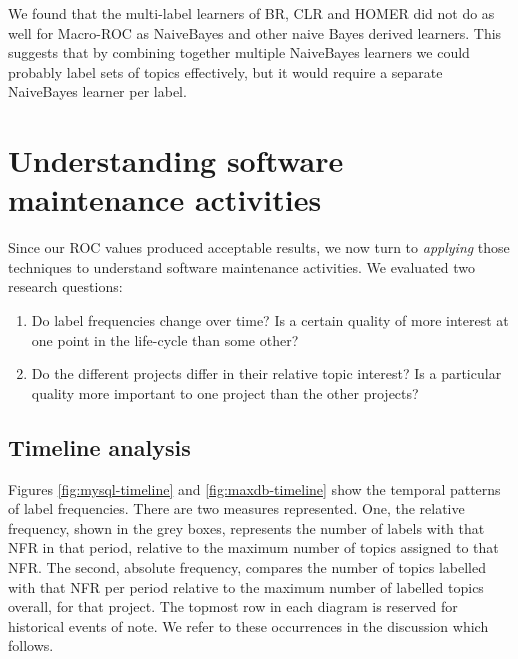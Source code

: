 \documentclass[]{sig-alternate}
\begin{document}
We found that the multi-label learners of BR, CLR and HOMER did not do as well for Macro-ROC as NaiveBayes and other naive Bayes derived learners. 
This suggests that by combining together multiple NaiveBayes learners we could probably label sets of topics effectively, but it would require a separate NaiveBayes learner per label.


\section{Understanding software maintenance activities} 
\label{sec:analysis}
Since our ROC values produced acceptable results, we now turn to \emph{applying} those techniques to understand software maintenance activities. We evaluated two research questions:
\begin{enumerate}
\item Do label frequencies change over time? Is a certain quality of more interest at one point in the life-cycle than some other? 
\item  Do the different projects differ in their relative topic interest? Is a particular quality more important to one project than the other projects?  
\end{enumerate}


\subsection{Timeline analysis}
Figures \ref{fig:mysql-timeline} and \ref{fig:maxdb-timeline} show the temporal patterns of label frequencies. 
There are two measures represented. 
One, the relative frequency, shown in the grey boxes, represents the number of labels with that NFR in that period, 
relative to the maximum number of topics assigned to that NFR. 
The second, absolute frequency, compares the number of topics labelled with that NFR per period 
relative to the maximum number of labelled topics overall, for that project. 
The topmost row in each diagram is reserved for historical events of note. 
We refer to these occurrences in the discussion which follows.
\end{document}
